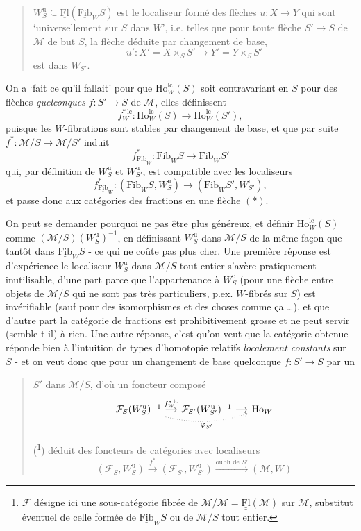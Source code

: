 \documentclass[11pt]{article}
\newcommand{\printedpage}[1]{\marginpar{\footnotesize p.~#1}}
\newcommand{\msp}[1]{\marginpar{\footnotesize [#1]}}
\newcommand{\Fib}{\underline{\mathrm{Fib}}}
\newcommand{\Fl}{\underline{\mathrm{Fl}}}
\newcommand{\cM}{\mathcal{M}}
\newcommand{\cF}{\mathcal{F}}
\newcommand{\Ho}{\mathrm{Ho}}
\newcommand{\Wu}{W^{\mathrm{u}}}
\newcommand{\lc}{\mathrm{lc}}
\begin{document}
\begin{quote}
$\Wu_S \subseteq \Fl(\Fib_W S)$ est le localiseur formé des flèches $u : X \longrightarrow Y$ qui sont ‘universellement sur $S$ dans $W$’, i.e. telles que pour toute flèche $S' \longrightarrow S$ de $\cM$ de but $S$, la flèche déduite par changement de base,
\[
u' : X' = X \times_S S' \longrightarrow Y' = Y \times_S S'
\]
est dans $W_{S'}$.
\end{quote}

On a ‘fait ce qu'il fallait’ pour que $\Ho^{\lc}_W(S)$ soit contravariant en $S$ pour des flèches \textit{quelconques} $f : S' \longrightarrow S$ de $\cM$, elles définissent
\[
f^{*\,\lc}_W : \Ho^{\lc}_W(S) \longrightarrow \Ho^{\lc}_W(S'), \tag*{$(**)$}
\]
\msp{page 211}
puisque les $W$-fibrations sont stables par changement de base, et que par suite $f^* : \cM/S \longrightarrow \cM/S'$ induit
\[
f^*_{\Fib_W} : \Fib_W S \longrightarrow \Fib_W S'
\]
qui, par définition de $\Wu_S$ et $\Wu_{S'}$, est compatible avec les localiseurs
\[
f^*_{\Fib_W} : (\Fib_W S, \Wu_S) \longrightarrow (\Fib_W S', \Wu_{S'}),
\]
et passe donc aux catégories des fractions en une flèche $(*)$.

On peut se demander pourquoi ne pas être plus généreux, et définir $\Ho^{\lc}_W(S)$ comme $(\cM/S)(\Wu_S)^{-1}$, en définissant $\Wu_S$ dans $\cM/S$ de la même façon que tantôt dans $\Fib_W S$ - ce qui ne coûte pas plus cher. Une première réponse est d'expérience le localiseur $\Wu_S$ dans $\cM/S$ tout entier s'avère pratiquement inutilisable, d'une part parce que l'appartenance à $\Wu_S$ (pour une flèche entre objets de $\cM/S$ qui ne sont pas très particuliers, p.ex. $W$-fibrés sur $S$) est invérifiable (sauf pour des isomorphismes et des choses comme ça \dots), et que d'autre part la catégorie de fractions est prohibitivement
\printedpage{137}
\msp{page 212}
grosse et ne peut servir (semble-t-il) à rien. Une autre réponse, c'est qu'on veut que la catégorie obtenue réponde bien à l'intuition de types d'homotopie relatifs \textit{localement constants} sur $S$ - et on veut donc que pour un changement de base quelconque $f : S' \longrightarrow S$ par un

\begin{quote}
$S'$ dans $\cM/S$, d'où un foncteur composé
\[
\begin{tikzcd}[column sep=small]
\cF_S(\Wu_S)^{-1} \arrow[r, "f^{*\,\lc}_W"] \arrow[rr, dotted, bend right=15, "\varphi_{S'}"'] & \cF_{S'}(\Wu_{S'})^{-1} \arrow[r] & \Ho_W
\end{tikzcd}
\]

(\footnote[121]{$\cF$ désigne ici une sous-catégorie fibrée de $\cM/\cM = \underline{\Fl}(\cM)$ sur $\cM$, substitut éventuel de celle formée de $\Fib_W S$ ou de $\cM/S$ tout entier.}) déduit des foncteurs de catégories avec localiseurs
\[
(\cF_S, \Wu_S) \xrightarrow{f^*} (\cF_{S'}, \Wu_{S'}) \xrightarrow{\text{oubli de } S'} (\cM, W)
\]
\end{quote}
\end{document}
